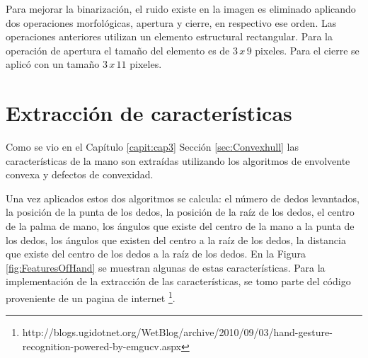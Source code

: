 Para mejorar la binarizaci\'on, el ruido existe en la imagen es eliminado aplicando dos operaciones morfológicas, apertura y cierre, en respectivo ese orden. Las operaciones anteriores utilizan un elemento estructural rectangular. Para la operación de apertura el tamaño del elemento es de $3 \, x \, 9$ pixeles. Para el cierre se aplic\'o con un tamaño  $3\, x \, 11$ pixeles.



\section{Extracción de características}\label{sec:ExtraccionCaracteristicasSystem}

Como se vio en el Capítulo \ref{capit:cap3} Sección \ref{sec:Convexhull} las características de la mano son extraídas utilizando los algoritmos de envolvente convexa y  defectos de convexidad.


Una vez aplicados estos dos algoritmos se calcula: el número de dedos levantados, la posición de la punta de los dedos, la posición de la raíz de los dedos, el centro de la palma de mano, los ángulos que existe del centro de la mano a la punta de los dedos, los ángulos que existen del centro a la raíz de los dedos, la distancia que existe del centro de los dedos a la raíz de los dedos. En la Figura \ref{fig:FeaturesOfHand} se muestran algunas de estas características. Para la implementación de la extracción de las características, se tomo parte del código proveniente de un pagina de internet \footnote{http://blogs.ugidotnet.org/WetBlog/archive/2010/09/03/hand-gesture-recognition-powered-by-emgucv.aspx}. 

